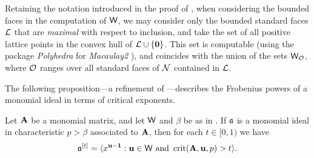 \documentclass{amsart}
\begin{document}
\begin{remark} \label{computibility of W: R}
   Retaining the notation introduced in the proof of , when considering the bounded faces in the computation of $\mathsf{W}$, we may consider only the bounded standard faces $\mathcal{L}$ that are \emph{maximal} with respect to inclusion, and take the set of all positive lattice points in the convex hull of $\mathcal{L}\cup \{\mathbf{0}\}$.
   This set is computable (\eg using the package \emph{Polyhedra} for \emph{Macaulay2} \cite{PolyhedraSource,M2}), 
   and coincides with the union of the sets $\mathsf{W}_{\mathcal{O}}$, where $\mathcal{O}$ ranges over all standard faces of $\mathcal{N}$ contained in $\mathcal{L}$.
\end{remark}

The following proposition---a refinement of \cite[Proposition~2.5]{hernandez+etal.frobenius_examples}---describes the Frobenius powers of a monomial ideal in terms of critical exponents.

\begin{proposition}
   \label{crits of mon ideals: P}
   Let $\mathbf{A}$ be a monomial matrix, and let $\mathsf{W}$ and $\beta$ be as in .
   If $\mathfrak{a}$ is a monomial ideal in characteristic $p>\beta$ associated to $\mathbf{A}$, then for each $t\in [0,1)$ we have
   \[ \mathfrak{a}^{[t]} = \langle x^{\mathbf{u}-\mathbf{1}} : \mathbf{u} \in \mathsf{W}\text{ and }\operatorname{crit}(\mathbf{A},\mathbf{u},p) > t \rangle.\]	
\end{proposition}
\end{document}
